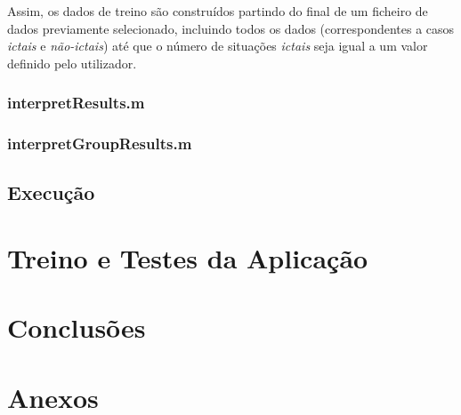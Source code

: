 \documentclass{article}
\begin{document}
Assim, os dados de treino são construídos partindo do final de um ficheiro de dados previamente selecionado, incluindo todos os dados (correspondentes a casos \emph{ictais} e \emph{não-ictais}) até que o número de situações \emph{ictais} seja igual a um valor definido pelo utilizador.

\subsubsection{interpretResults.m}



\subsubsection{interpretGroupResults.m}

\subsection{Execução}


\pagebreak

\section{Treino e Testes da Aplicação}



\pagebreak

\section{Conclusões}


\pagebreak

\section{Anexos}
\end{document}
